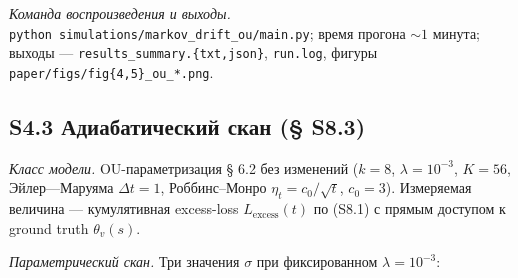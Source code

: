 \documentclass[pdflatex,sn-mathphys-ay]{sn-jnl}
\begin{document}
\emph{Команда воспроизведения и выходы.} \texttt{python\ simulations/markov\_drift\_ou/main.py}; время прогона \(\sim 1\) минута; выходы --- \texttt{results\_summary.\{txt,json\}}, \texttt{run.log}, фигуры \texttt{paper/figs/fig\{4,5\}\_ou\_*.png}.



\subsection*{S4.3 Адиабатический скан (§ S8.3)}\label{s4.3-ux430ux434ux438ux430ux431ux430ux442ux438ux447ux435ux441ux43aux438ux439-ux441ux43aux430ux43d-s8.3}



\emph{Класс модели.} OU-параметризация § 6.2 без изменений (\(k = 8\), \(\lambda = 10^{-3}\), \(K = 56\), Эйлер---Маруяма \(\Delta t = 1\), Роббинс--Монро \(\eta_t = c_0 / \sqrt{t}\), \(c_0 = 3\)). Измеряемая величина --- кумулятивная excess-loss \(L_{\text{excess}}(t)\) по (S8.1) с прямым доступом к ground truth \(\theta_v(s)\).



\emph{Параметрический скан.} Три значения \(\sigma\) при фиксированном \(\lambda = 10^{-3}\):
\end{document}
